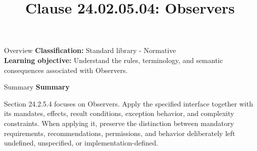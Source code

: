 \documentclass[10pt,letterpaper]{article}
\title{Clause 24.02.05.04: Observers}
\author{}
\date{}
\begin{document}
\maketitle
\begin{CornellOverviewBox}{Overview}
\textbf{Classification:} Standard library - Normative\\[2pt]
\textbf{Learning objective:} Understand the rules, terminology, and semantic consequences associated with Observers.
\end{CornellOverviewBox}\begin{CornellSummaryBox}{Summary}
{\sffamily\bfseries\color{Accent} Summary}\par\vspace{3pt}Section 24.2.5.4 focuses on Observers. Apply the specified interface together with its mandates, effects, result conditions, exception behavior, and complexity constraints. When applying it, preserve the distinction between mandatory requirements, recommendations, permissions, and behavior deliberately left undefined, unspecified, or implementation-defined.
\end{CornellSummaryBox}
\end{document}
